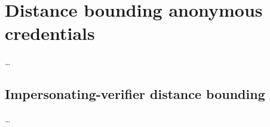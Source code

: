 \mode*
\section{Distance bounding anonymous credentials}%
\label{DB-anon-cred}


\dots

\subsection{Impersonating-verifier distance bounding}

\dots


